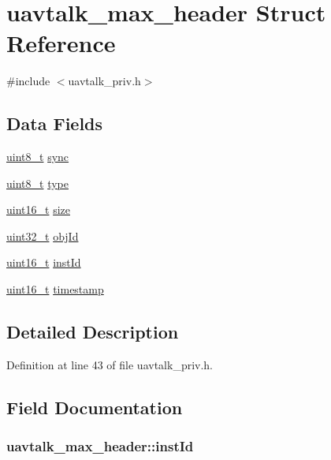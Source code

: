 \hypertarget{structuavtalk__max__header}{\section{uavtalk\-\_\-max\-\_\-header Struct Reference}
\label{structuavtalk__max__header}
}


{\ttfamily \#include $<$uavtalk\-\_\-priv.\-h$>$}

\subsection*{Data Fields}
\begin{DoxyCompactItemize}
\item 
\hyperlink{stdint_8h_aba7bc1797add20fe3efdf37ced1182c5}{uint8\-\_\-t} \hyperlink{structuavtalk__max__header_a345956ffa399c59404b4e1523001759a}{sync}
\item 
\hyperlink{stdint_8h_aba7bc1797add20fe3efdf37ced1182c5}{uint8\-\_\-t} \hyperlink{structuavtalk__max__header_a5b36790b1ee1944fe8d335b817e5f424}{type}
\item 
\hyperlink{stdint_8h_a273cf69d639a59973b6019625df33e30}{uint16\-\_\-t} \hyperlink{structuavtalk__max__header_a8c446383de21042da34e0f6e2900772a}{size}
\item 
\hyperlink{stdint_8h_a435d1572bf3f880d55459d9805097f62}{uint32\-\_\-t} \hyperlink{structuavtalk__max__header_ae86ac377823746b4ec927b0bf9d7d79b}{obj\-Id}
\item 
\hyperlink{stdint_8h_a273cf69d639a59973b6019625df33e30}{uint16\-\_\-t} \hyperlink{structuavtalk__max__header_a01123d41274c0fb4858bc676a7a6bccb}{inst\-Id}
\item 
\hyperlink{stdint_8h_a273cf69d639a59973b6019625df33e30}{uint16\-\_\-t} \hyperlink{structuavtalk__max__header_a9dcfa0653337ea23ff5de9ba704d8db7}{timestamp}
\end{DoxyCompactItemize}


\subsection{Detailed Description}


Definition at line 43 of file uavtalk\-\_\-priv.\-h.



\subsection{Field Documentation}
\hypertarget{structuavtalk__max__header_a01123d41274c0fb4858bc676a7a6bccb}{
\subsubsection[{inst\-Id}]{ uavtalk\-\_\-max\-\_\-header\-::inst\-Id}}\label{structuavtalk__max__header_a01123d41274c0fb4858bc676a7a6bccb}


